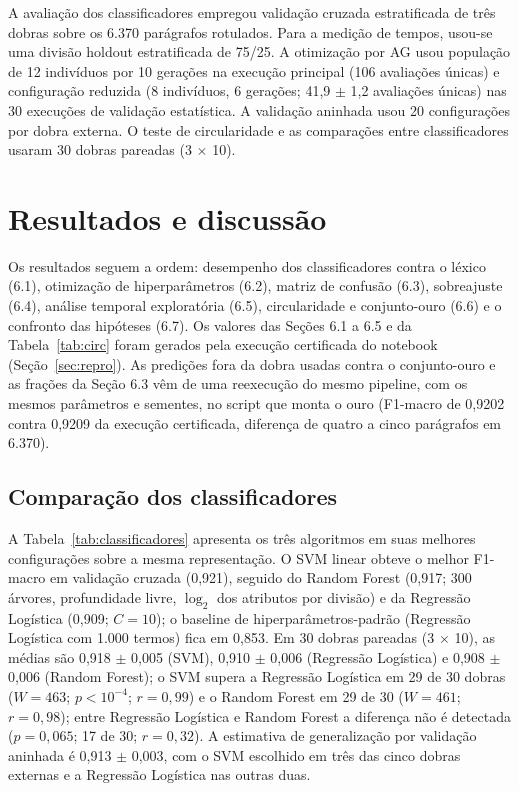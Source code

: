 \documentclass[fleqn,10pt]{SelfArx}
\begin{document}
A avaliação dos classificadores empregou validação cruzada estratificada de três dobras sobre os 6.370 parágrafos rotulados. Para a medição de tempos, usou-se uma divisão holdout estratificada de 75/25. A otimização por AG usou população de 12 indivíduos por 10 gerações na execução principal (106 avaliações únicas) e configuração reduzida (8 indivíduos, 6 gerações; 41,9 $\pm$ 1,2 avaliações únicas) nas 30 execuções de validação estatística. A validação aninhada usou 20 configurações por dobra externa. O teste de circularidade e as comparações entre classificadores usaram 30 dobras pareadas (3 $\times$ 10).

\section{Resultados e discussão}
\label{sec:resultados}

Os resultados seguem a ordem: desempenho dos classificadores contra o léxico (6.1), otimização de hiperparâmetros (6.2), matriz de confusão (6.3), sobreajuste (6.4), análise temporal exploratória (6.5), circularidade e conjunto-ouro (6.6) e o confronto das hipóteses (6.7). Os valores das Seções 6.1 a 6.5 e da Tabela~\ref{tab:circ} foram gerados pela execução certificada do notebook (Seção~\ref{sec:repro}). As predições fora da dobra usadas contra o conjunto-ouro e as frações da Seção 6.3 vêm de uma reexecução do mesmo pipeline, com os mesmos parâmetros e sementes, no script que monta o ouro (F1-macro de 0,9202 contra 0,9209 da execução certificada, diferença de quatro a cinco parágrafos em 6.370).

\subsection{Comparação dos classificadores}
\label{sec:classificadores}

A Tabela~\ref{tab:classificadores} apresenta os três algoritmos em suas melhores configurações sobre a mesma representação. O SVM linear obteve o melhor F1-macro em validação cruzada (0,921), seguido do Random Forest (0,917; 300 árvores, profundidade livre, $\log_2$ dos atributos por divisão) e da Regressão Logística (0,909; $C = 10$); o baseline de hiperparâmetros-padrão (Regressão Logística com 1.000 termos) fica em 0,853. Em 30 dobras pareadas (3 $\times$ 10), as médias são 0,918 $\pm$ 0,005 (SVM), 0,910 $\pm$ 0,006 (Regressão Logística) e 0,908 $\pm$ 0,006 (Random Forest); o SVM supera a Regressão Logística em 29 de 30 dobras ($W = 463$; $p < 10^{-4}$; $r = 0{,}99$) e o Random Forest em 29 de 30 ($W = 461$; $r = 0{,}98$); entre Regressão Logística e Random Forest a diferença não é detectada ($p = 0{,}065$; 17 de 30; $r = 0{,}32$). A estimativa de generalização por validação aninhada é 0,913 $\pm$ 0,003, com o SVM escolhido em três das cinco dobras externas e a Regressão Logística nas outras duas.
\end{document}
